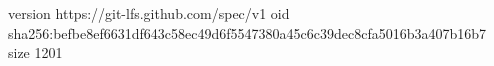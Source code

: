 version https://git-lfs.github.com/spec/v1
oid sha256:befbe8ef6631df643c58ec49d6f5547380a45c6c39dec8cfa5016b3a407b16b7
size 1201
